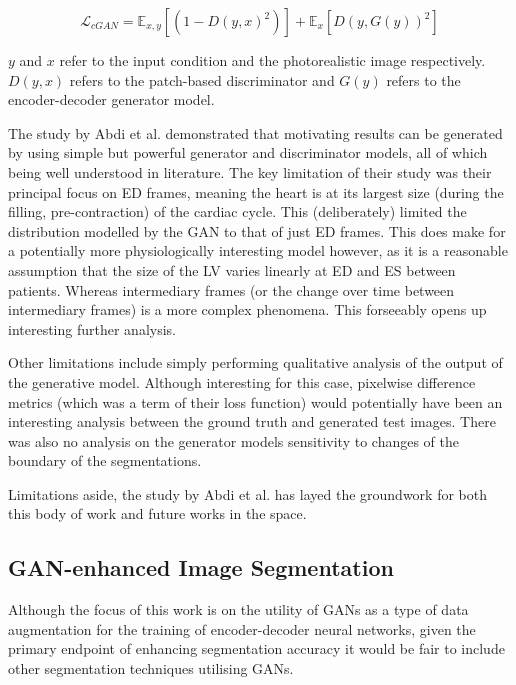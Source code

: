 \begin{equation}
        \mathcal{L}_{cGAN} = \mathbb{E}_{x,y}[(1-D(y,x)^{2})] + \mathbb{E}_{x}[D(y,G(y))^2]
\end{equation}

$y$ and $x$ refer to the input condition and the photorealistic image
respectively. $D(y,x)$ refers to the patch-based discriminator and $G(y)$
refers to the encoder-decoder generator model. \newline

The study by Abdi et al. demonstrated that motivating results can be generated by using
simple but powerful generator and discriminator models, all of which being well
understood in literature. The key limitation of their study was their principal
focus on ED frames, meaning the heart is at its largest size (during the
filling, pre-contraction) of the cardiac cycle. This (deliberately) limited the
distribution modelled by the GAN to that of just ED frames. This does make for a
potentially more physiologically interesting model however, as it is a
reasonable assumption that the size of the LV varies linearly at ED and ES
between patients. Whereas intermediary frames (or the change over time between
intermediary frames) is a more complex phenomena. This forseeably opens up
interesting further analysis. \newline

Other limitations include simply performing qualitative analysis of the output
of the generative model. Although interesting for this case, pixelwise
difference metrics (which was a term of their loss function) would potentially
have been an interesting analysis between the ground truth and generated test
images. There was also no analysis on the generator models sensitivity to
changes of the boundary of the segmentations. \newline

Limitations aside, the study by Abdi et al. has layed the groundwork for both this body of
work and future works in the space. \newline

\subsection{GAN-enhanced Image Segmentation}

Although the focus of this work is on the utility of GANs as a type of data
augmentation for the training of encoder-decoder neural networks, given the
primary endpoint of enhancing segmentation accuracy it would be fair to include
other segmentation techniques utilising GANs. \newline

